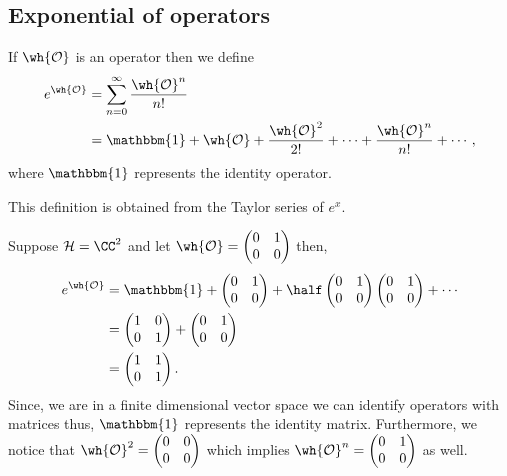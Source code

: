 \documentclass[12pt, a4paper]{article}
\begin{document}
\subsection{Exponential of operators}

\begin{definition}
    If \(\wh{\mathcal{O}}\) is an operator then we define
    \[\begin{aligned}
        e^{\wh{\mathcal{O}}} &= \sum_{n=0}^{\infty} \frac{\wh{\mathcal{O}}^n}{n!} \\
        &= \mathbbm{1}+ \wh{\mathcal{O}}+ \frac{\wh{\mathcal{O}}^2}{2!} + \cdots + \frac{\wh{\mathcal{O}}^n}{n!} +\cdots,
    \end{aligned}\]
    where \(\mathbbm{1}\) represents the identity operator.
\end{definition}

\begin{mdnote}
    This definition is obtained from the Taylor series of \(e^x\).
\end{mdnote}

\begin{example}
    Suppose \(\mathcal{H}=\CC^2\) and let \(\wh{\mathcal{O}} = \begin{pmatrix} 0 & 1 \\ 0 & 0\end{pmatrix}\) then,
    \[\begin{aligned}
        e^{\wh{\mathcal{O}}} &= \mathbbm{1} + \begin{pmatrix} 0 & 1 \\ 0 & 0\end{pmatrix} + \half \begin{pmatrix} 0 & 1 \\ 0 & 0\end{pmatrix}\begin{pmatrix} 0 & 1 \\ 0 & 0\end{pmatrix} +\cdots \\
        &= \begin{pmatrix} 1 &0 \\ 0 & 1\end{pmatrix} + \begin{pmatrix} 0 & 1 \\ 0 & 0\end{pmatrix} \\
        &= \begin{pmatrix} 1 & 1 \\ 0 & 1\end{pmatrix}.
    \end{aligned}\]
    Since, we are in a finite dimensional vector space we can identify operators with matrices thus, \(\mathbbm{1}\) represents the identity matrix. Furthermore, we notice that \(\wh{\mathcal{O}}^2 = \begin{pmatrix} 0 & 0 \\ 0 & 0\end{pmatrix}\) which implies \(\wh{\mathcal{O}}^n=\begin{pmatrix} 0 & 1 \\ 0 & 0\end{pmatrix}\) as well.
\end{example}
\end{document}
